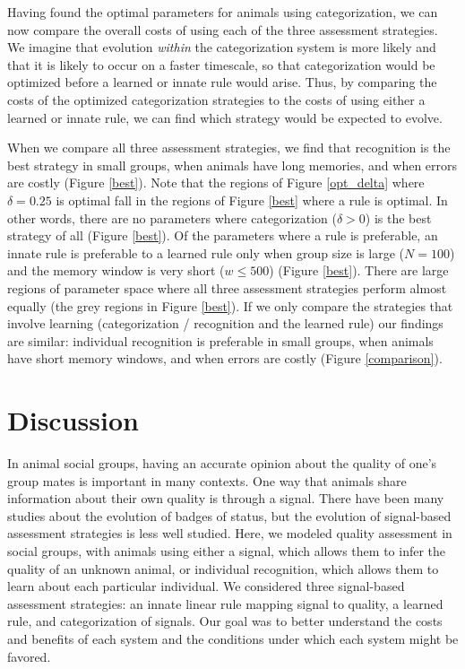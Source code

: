 Having found the optimal parameters for animals using categorization, we can now compare the overall costs of using each of the three assessment strategies. We imagine that evolution \emph{within} the categorization system is more likely and that it is likely to occur on a faster timescale, so that categorization would be optimized before a learned or innate rule would arise.  Thus, by comparing the costs of the optimized categorization strategies to the costs of using either a learned or innate rule, we can find which strategy would be expected to evolve.

When we compare all three assessment strategies, we find that recognition is the best strategy in small groups, when animals have long memories, and when errors are costly (Figure \ref{best}). Note that the regions of Figure \ref{opt_delta} where $\delta=0.25$ is optimal fall in the regions of Figure \ref{best} where a rule is optimal. In other words, there are no parameters where categorization ($\delta>0$) is the best strategy of all (Figure \ref{best}).  Of the parameters where a rule is preferable, an innate rule is preferable to a learned rule only when group size is large ($N=100$) and the memory window is very short ($w\leq500$) (Figure \ref{best}). There are large regions of parameter space where all three assessment strategies perform almost equally (the grey regions in Figure \ref{best}). If we only compare the strategies that involve learning (categorization / recognition and the learned rule) our findings are similar: individual recognition is preferable in small groups, when animals have short memory windows, and when errors are costly (Figure \ref{comparison}).

\section*{Discussion}
In animal social groups, having an accurate opinion about the quality of one's group mates is important in many contexts. One way that animals share information about their own quality is through a signal. There have been many studies about the evolution of badges of status, but the evolution of signal-based assessment strategies is less well studied. Here, we modeled quality assessment in social groups, with animals using either a signal, which allows them to infer the quality of an unknown animal, or individual recognition, which allows them to learn about each particular individual. We considered three signal-based assessment strategies: an innate linear rule mapping signal to quality, a learned rule, and categorization of signals. Our goal was to better understand the costs and benefits of each system and the conditions under which each system might be favored. 

